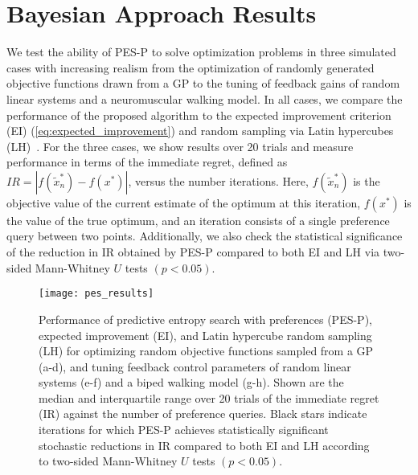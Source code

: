 \section{Bayesian Approach Results}\label{s:results}
We test the ability of PES-P to solve optimization problems in three simulated
cases with increasing realism from the optimization of randomly generated
objective functions drawn from a GP to the tuning of feedback gains of random
linear systems and a neuromuscular walking model. In all cases, we compare the
performance of the proposed algorithm to the expected improvement criterion (EI)
(\cref{eq:expected_improvement}) and random sampling via Latin hypercubes
(LH)~\citep{mckay2000comparison}. For the three cases, we show results over
20 trials and measure performance in terms of the immediate regret, defined as
$IR = |f(\tilde x_n^*) - f(x^*)|$, versus the number iterations.  Here,
$f(\tilde x_n^*)$ is the objective value of the current estimate of the optimum
at this iteration, $f(x^*)$ is the value of the true optimum, and an iteration
consists of a single preference query between two points.  Additionally, we also
check the statistical significance of the reduction in IR obtained by PES-P
compared to both EI and LH via two-sided Mann-Whitney $U$ tests $(p < 0.05)$.

\begin{figure*}[t!]
    \centering
    \texttt{[image: pes\_results]}
    \caption[Comparison of Preference-based Bayesian optimization
    methods]{Performance of predictive entropy search with preferences (PES-P),
    expected improvement (EI), and Latin hypercube random sampling (LH) for
    optimizing random objective functions sampled from a GP (a-d), and tuning
    feedback control parameters of random linear systems (e-f) and a biped
    walking model (g-h). Shown are the median and interquartile range over 20
    trials of the immediate regret (IR) against the number of preference
    queries. Black stars indicate iterations for which PES-P achieves
    statistically significant stochastic reductions in IR compared to both EI
    and LH according to two-sided Mann-Whitney $U$ tests $(p <
    0.05)$.}\label{fig:y_err_sim}
\end{figure*}

